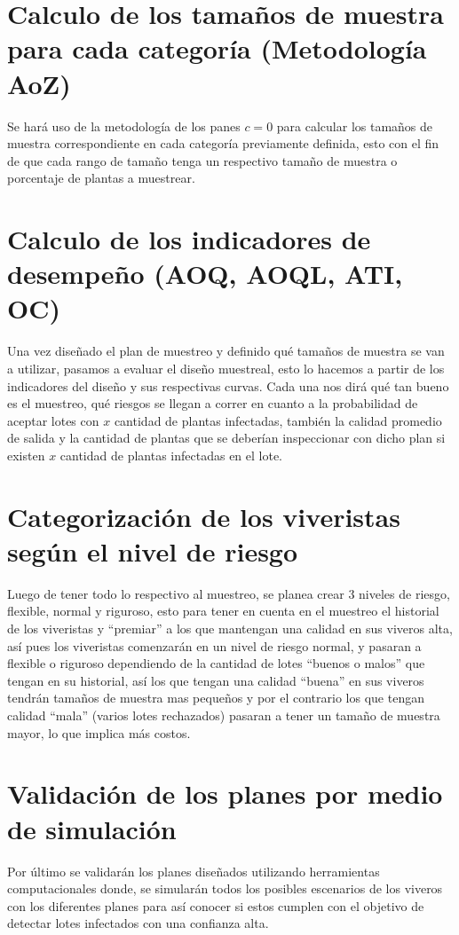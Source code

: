 \section{Calculo de los tama\~{n}os de muestra para cada categor\'{i}a (Metodolog\'{i}a AoZ)} 

Se har\'{a} uso de la metodolog\'{i}a de los panes $c=0$ para calcular los tama\~{n}os de muestra correspondiente en cada categor\'{i}a previamente definida, esto con el fin de que cada rango de tama\~{n}o tenga un respectivo tama\~{n}o de muestra o porcentaje de plantas a muestrear.

\section{Calculo de los indicadores de desempe\~{n}o (AOQ, AOQL, ATI, OC)}

Una vez dise\~{n}ado el plan de muestreo y definido qu\'{e} tama\~{n}os de muestra se van a utilizar, pasamos a evaluar el dise\~{n}o muestreal, esto lo hacemos a partir de los indicadores del dise\~{n}o y sus respectivas curvas. Cada una nos dir\'{a} qu\'{e} tan bueno es el muestreo, qu\'{e} riesgos se llegan a correr en cuanto a la probabilidad de aceptar lotes con $x$ cantidad de plantas infectadas, tambi\'{e}n la calidad promedio de salida y la cantidad de plantas que se deber\'{i}an inspeccionar con dicho plan si existen $x$ cantidad de plantas infectadas en el lote.

\section{Categorizaci\'{o}n de los viveristas seg\'{u}n el nivel de riesgo} 

Luego de tener todo lo respectivo al muestreo, se planea crear 3 niveles de riesgo, flexible, normal y riguroso, esto para tener en cuenta en el muestreo el historial de los viveristas y ``premiar'' a los que mantengan una calidad en sus viveros alta, as\'{i} pues los viveristas comenzar\'{a}n en un nivel de riesgo normal, y pasaran a flexible o riguroso dependiendo de la cantidad de lotes ``buenos o malos'' que tengan en su historial, as\'{i} los que tengan una calidad ``buena'' en sus viveros tendr\'{a}n tama\~{n}os de muestra mas peque\~{n}os y por el contrario los que tengan calidad ``mala'' (varios lotes rechazados) pasaran a tener un  tama\~{n}o de muestra mayor, lo que implica m\'{a}s costos.

\section{Validaci\'{o}n de los planes por medio de simulaci\'{o}n}

Por \'{u}ltimo se validar\'{a}n los planes dise\~{n}ados utilizando herramientas computacionales donde, se simular\'{a}n todos los posibles escenarios de los viveros con los diferentes planes para as\'{i} conocer si estos cumplen con el objetivo de detectar lotes infectados con una confianza alta.


